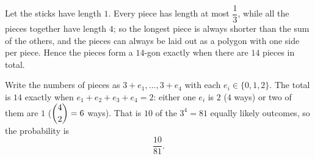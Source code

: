 Let the sticks have length $1$. Every piece has length at most $\dfrac{1}{3}$, while all the pieces together have length $4$; so the longest piece is always shorter than the sum of the others, and the pieces can always be laid out as a polygon with one side per piece. Hence the pieces form a $14$-gon exactly when there are $14$ pieces in total.

Write the numbers of pieces as $3+e_1,\dots,3+e_4$ with each $e_i\in\{0,1,2\}$. The total is $14$ exactly when $e_1+e_2+e_3+e_4=2$: either one $e_i$ is $2$ ($4$ ways) or two of them are $1$ ($\dbinom42=6$ ways). That is $10$ of the $3^4=81$ equally likely outcomes, so the probability is
\[
\boxed{\dfrac{10}{81}}.
\]
